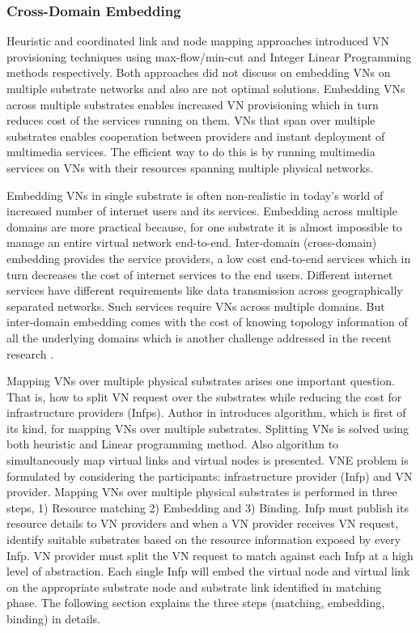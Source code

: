 \documentclass[article,dr=phil,type=msc ,colorback,accentcolor=tud4b]{tudthesis}
\begin{document}
\newpage
\subsubsection{Cross-Domain Embedding} \label{CDE}
Heuristic and coordinated link and node mapping approaches introduced VN provisioning techniques using max-flow/min-cut and Integer Linear Programming methods respectively. Both approaches did not discuss on embedding VNs on multiple substrate networks and also are not optimal solutions. Embedding VNs across multiple substrates enables increased VN provisioning which in turn reduces cost of the services running on them. VNs that span over multiple substrates enables cooperation between providers and instant deployment of multimedia services. The efficient way to do this is by running multimedia services on VNs with their resources spanning multiple physical networks.\newline

Embedding VNs in single substrate is often non-realistic in today's world of increased number of internet users and its services. Embedding across multiple domains are more practical because, for one substrate it is almost impossible to manage an entire virtual network end-to-end. Inter-domain (cross-domain) embedding provides the service providers, a low cost end-to-end services which in turn decreases the cost of  internet services to the end users. Different internet services have different requirements like data transmission across geographically separated networks. Such services require VNs across multiple domains. But inter-domain embedding comes with the cost of knowing topology information of all the underlying domains which is another challenge addressed in the recent research .\newline

Mapping VNs over multiple physical substrates arises one important question. That is, how to split VN request over the substrates while reducing the cost for infrastructure providers (Infps). Author in \cite{vn_multiple} introduces algorithm, which is first of its kind, for mapping VNs over multiple substrates. Splitting VNs is solved using both heuristic and Linear programming method. Also algorithm to simultaneously map virtual links and virtual nodes is presented. VNE problem is formulated by considering the participants: infrastructure provider (Infp) and VN provider. Mapping VNs over multiple physical substrates is performed in three steps, 1) Resource matching 2) Embedding and 3) Binding. Infp must publish its resource details to VN providers and when a VN provider receives VN request, identify suitable substrates based on the resource information exposed by every Infp. VN provider must split the VN request to match against each Infp at a high level of abstraction. Each single Infp will embed the virtual node and virtual link on the appropriate substrate node and substrate link identified in matching phase. The following section explains the three steps (matching, embedding, binding) in details.\newline
\end{document}
